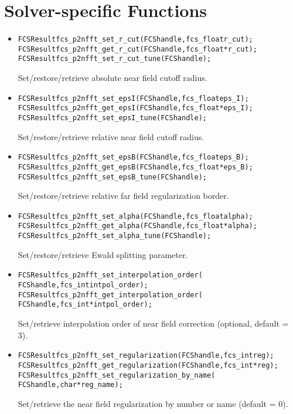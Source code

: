 \section{Solver-specific Functions}
\begin{itemize}
  \item
\begin{alltt}
FCSResult fcs_p2nfft_set_r_cut(FCS handle, fcs_float r_cut);
FCSResult fcs_p2nfft_get_r_cut(FCS handle, fcs_float* r_cut);
FCSResult fcs_p2nfft_set_r_cut_tune(FCS handle);
\end{alltt}
    Set/restore/retrieve absolute near field cutoff radius.
  \item
\begin{alltt}
FCSResult fcs_p2nfft_set_epsI(FCS handle, fcs_float eps_I);
FCSResult fcs_p2nfft_get_epsI(FCS handle, fcs_float* eps_I);
FCSResult fcs_p2nfft_set_epsI_tune(FCS handle);
\end{alltt}
    Set/restore/retrieve relative near field cutoff radius.
  \item
\begin{alltt}
FCSResult fcs_p2nfft_set_epsB(FCS handle, fcs_float eps_B);
FCSResult fcs_p2nfft_get_epsB(FCS handle, fcs_float* eps_B);
FCSResult fcs_p2nfft_set_epsB_tune(FCS handle);
\end{alltt}
    Set/restore/retrieve relative far field regularization border.
  \item
\begin{alltt}
FCSResult fcs_p2nfft_set_alpha(FCS handle, fcs_float alpha);
FCSResult fcs_p2nfft_get_alpha(FCS handle, fcs_float* alpha);
FCSResult fcs_p2nfft_set_alpha_tune(FCS handle);
\end{alltt}
    Set/restore/retrieve Ewald splitting parameter.
  \item
\begin{alltt}
FCSResult fcs_p2nfft_set_interpolation_order(
    FCS handle, fcs_int intpol_order);
FCSResult fcs_p2nfft_get_interpolation_order(
    FCS handle, fcs_int* intpol_order);
\end{alltt}
    Set/retrieve interpolation order of near field correction (optional, default = 3).
  \item
\begin{alltt}
FCSResult fcs_p2nfft_set_regularization(FCS handle, fcs_int reg);
FCSResult fcs_p2nfft_get_regularization(FCS handle, fcs_int* reg);
FCSResult fcs_p2nfft_set_regularization_by_name(
    FCS handle, char* reg_name);
\end{alltt}
    Set/retrieve the near field regularization by number or name (default = 0).

\end{itemize}
